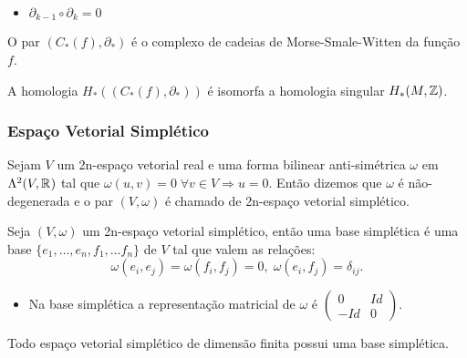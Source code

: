\documentclass{beamer}
\begin{document}
\begin{footnotesize}
\begin{frame}
\begin{definicao}
\begin{itemize}
				\item $\partial_{k-1}\circ \partial_{k}  =0$
			\end{itemize}
			O par $(C_{*}(f), \partial_{*})$ é o complexo de cadeias de Morse-Smale-Witten  da função $f$.
		\end{definicao}
		
		
		\begin{teorema}
			 A homologia $H_{*}((C_{*}(f), \partial_{*})) $ é isomorfa a homologia singular $H_{*}(M, \mathbb{Z})$.
		\end{teorema}
	\end{frame}
	
	\begin{frame}
		\frametitle{Espaço Vetorial Simplético}
		\begin{definicao}
			Sejam $V$ um 2n-espaço vetorial real e uma forma bilinear anti-simétrica $\omega$ em $\Lambda^{2}(V, \mathbb{R}^{})$ tal que $\omega(u,v) = 0 \; \forall v \in V \Rightarrow u=0$. Então dizemos que $\omega$ é não-degenerada e o par $(V, \omega)$ é chamado de 2n-espaço vetorial simplético.
		\end{definicao}
	
		\begin{definicao}
			Seja $(V, \omega)$ um 2n-espaço vetorial simplético, então uma base simplética é uma base $\{ e_{1},\dots, e_{n},f_{1},\dots f_{n}\}$ de $V$ tal que valem as relações:
			$$
			\omega(e_{i}, e_{j}) = \omega(f_{i}, f_{j}) = 0, \; \omega(e_{i}, f_{j}) = \delta_{ij}.
			$$
		\end{definicao}
		\begin{itemize}
			\item 	Na base simplética a representação matricial de $\omega$ é $\left(
			\begin{array}{cc}
			0 & Id
			\\
			-Id & 0
			\end{array}
			\right) $.
		\end{itemize}
		
			\begin{teorema}
				Todo espaço vetorial simplético de dimensão finita possui uma base simplética.
			\end{teorema}
	
	\end{frame}
	


\end{footnotesize}
\end{document}

